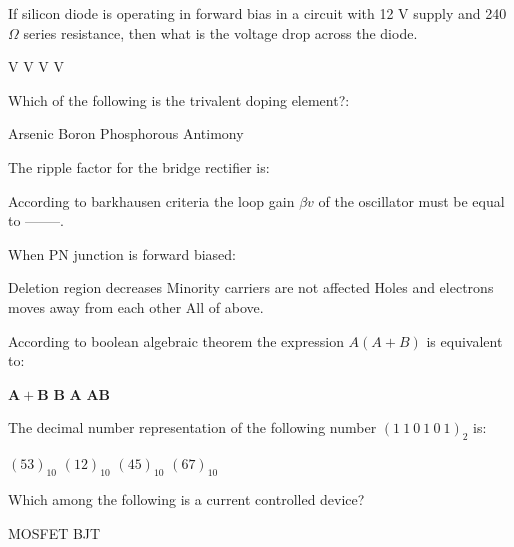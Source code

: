 \documentclass[a4, 12pt, addpoints]{exam}
\begin{document}
\begin{questions}
\question If silicon diode is operating in forward bias in a circuit with 12 V supply and 240 $\Omega$ series resistance, then what is the voltage drop across the diode. \\[0.3cm]
\begin{oneparchoices}
 V
 V
 V
 V
\end{oneparchoices}  
\question Which of the following is the trivalent doping element?:\\[0.3cm]
\begin{oneparchoices}
\choice Arsenic
\choice Boron
\choice Phosphorous
\choice Antimony
\end{oneparchoices}  
\question The ripple factor for the bridge rectifier is:\\[0.3cm]
\begin{oneparchoices}
\end{oneparchoices}  
\question According to barkhausen criteria the loop gain $\beta v$ of the oscillator must be equal to --------.\\[0.3cm]
\begin{oneparchoices}
\end{oneparchoices}
\question When PN junction is forward biased:\\[0.3cm]
 \begin{oneparchoices}
\choice Deletion region decreases
\choice Minority carriers are not affected
\choice Holes and electrons moves away from each other
\choice All of above.
\end{oneparchoices} 
\question According to boolean algebraic theorem  the expression $A (A + B)$ is equivalent to: \\[0.3cm]
 \begin{oneparchoices}
\choice $\pmb{A + B} $ 
\choice $\pmb{B}$
\choice $\pmb{A}$
\choice $\pmb{AB}$
\end{oneparchoices} 
\question The decimal number representation of the following number $ (1~1~0~1~0~1)_2 $ is: \\[0.3cm]
\begin{oneparchoices}
\choice $ (53)_{10} $ 
\choice $ (12)_{10} $
\choice $ (45)_{10}$
\choice $ (67)_{10} $
\end{oneparchoices} 
\question Which among the following is a current controlled device?
\begin{oneparchoices}
\choice MOSFET
\choice BJT

\end{oneparchoices}
\end{questions}
\end{document}
